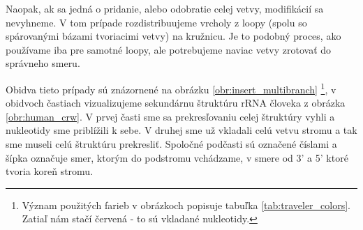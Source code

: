 Naopak, ak sa jedná o pridanie, alebo odobratie celej vetvy, modifikácií sa nevyhneme.
V tom prípade rozdistribuujeme vrcholy z loopy (spolu so spárovanými bázami tvoriacimi
vetvy) na kružnicu. Je to podobný proces, ako používame iba pre samotné loopy,
ale potrebujeme naviac vetvy zrotovať do správneho smeru.

Obidva tieto prípady sú znázornené na obrázku \ref{obr:insert_multibranch}
\footnote{Význam použitých farieb v obrázkoch popisuje tabuľka \ref{tab:traveler_colors}.
  Zatiaľ nám stačí červená - to sú vkladané nukleotidy.},
v obidvoch častiach vizualizujeme sekundárnu štruktúru rRNA človeka z obrázka \ref{obr:human_crw}.
V prvej časti sme sa prekresľovaniu celej štruktúry vyhli a nukleotidy sme
priblížili k sebe. V druhej sme už vkladali celú vetvu stromu a tak sme museli
celú štruktúru prekresliť. Spoločné podčasti sú označené číslami a šípka označuje
smer, ktorým do podstromu vchádzame, v smere od 3' a 5' ktoré tvoria koreň stromu.

